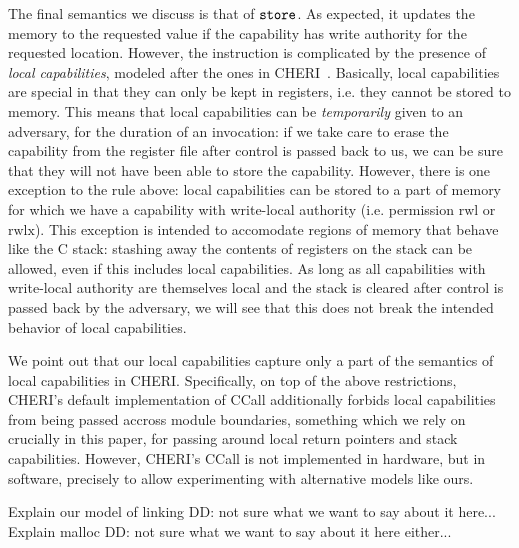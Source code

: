 \documentclass[compsoc,conference,letterpaper,fleqn]{IEEEtran}
\newcommand\dominique[1]{{\color{purple} \sf \footnotesize {DD: #1}}\\}
\newcommand{\zinstr}[1]{\mathtt{#1}}
\newcommand{\twoinstr}[3]{
  \ifthenelse{\equal{#2#3}{}}
  {\zinstr{#1}}
  {\zinstr{#1} \; #2 \; #3}
}
\newcommand{\store}[2]{\twoinstr{store}{#1}{#2}}
\newcommand{\plainperm}[1]{\mathrm{#1}}
\newcommand{\readwritel}{\plainperm{rwl}}
\newcommand{\rwl}{\readwritel}
\newcommand{\rwlx}{\plainperm{rwlx}}
\begin{document}
The final semantics we discuss is that of $\store{}{}$. As expected, it updates
the memory to the requested value if the capability has write authority for the
requested location. However, the instruction is complicated by the presence of
\emph{local capabilities}, modeled after the ones in
CHERI~\cite{Watson2015Cheri}. Basically, local capabilities are special in that
they can only be kept in registers, i.e. they cannot be stored to memory. This
means that local capabilities can be \emph{temporarily} given to an adversary,
for the duration of an invocation: if we take care to erase the capability from
the register file after control is passed back to us, we can be sure that they
will not have been able to store the capability. However, there is one exception
to the rule above: local capabilities can be stored to a part of memory for
which we have a capability with write-local authority (i.e. permission $\rwl$ or
$\rwlx$). This exception is intended to accomodate regions of memory that behave
like the C stack: stashing away the contents of registers on the stack can be
allowed, even if this includes local capabilities. As long as all capabilities
with write-local authority are themselves local and the stack is cleared after
control is passed back by the adversary, we will see that this does not break
the intended behavior of local capabilities.

We point out that our local capabilities capture only a part of the semantics of
local capabilities in CHERI. Specifically, on top of the above restrictions,
CHERI's default implementation of CCall additionally forbids local capabilities
from being passed accross module boundaries, something which we rely on
crucially in this paper, for passing around local return pointers and stack
capabilities. However, CHERI's CCall is not implemented in hardware, but in
software, precisely to allow experimenting with alternative models like ours.


Explain our model of linking
\dominique{not sure what we want to say about it here...}

Explain malloc
\dominique{not sure what we want to say about it here either...}
\end{document}
